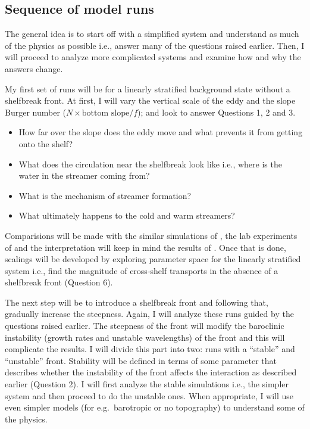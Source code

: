 \subsection{Sequence of model runs} \label{sec:work}

The general idea is to start off with a simplified system and understand as much of the physics as possible i.e., answer many of the questions raised earlier. Then, I will proceed to analyze more complicated systems and examine how and why the answers change. 

My first set of runs will be for a linearly stratified background state without a shelfbreak front. At first, I will vary the vertical scale of the eddy and the slope Burger number ($ N \times \text{bottom slope} / f$); and look to answer Questions 1, 2 and 3.
\begin{itemize}
\item How far over the slope does the eddy move and what prevents it from getting onto the shelf?
\item What does the circulation near the shelfbreak look like i.e., where is the water in the streamer coming from?
\item What is the mechanism of streamer formation?
\item What ultimately happens to the cold and warm streamers?
\end{itemize}

  Comparisions will be made with the similar simulations of \cite{Frolov2004,Oey2004,Hyun2008,Wei2009}, the lab experiments of \cite{Cenedese2012} and the interpretation will keep in mind the results of \cite{Chapman1987,Kelly1988}. Once that is done, scalings will be developed by exploring parameter space for the linearly stratified system i.e., find the magnitude of cross-shelf transports in the absence of a shelfbreak front (Question 6). 
   
The next step will be to introduce a shelfbreak front and following that, gradually increase the steepness. Again, I will analyze these runs guided by  the questions raised earlier. The steepness of the front will modify the baroclinic instability (growth rates and unstable wavelengths) of the front \citep{Lozier2002} and this will complicate the results. I will divide this part into two: runs with a “stable” and “unstable” front. Stability will be defined in terms of some parameter that describes whether the instability of the front affects the interaction as described earlier (Question 2). I will first analyze the stable simulations i.e., the simpler system and then proceed to do the unstable ones. When appropriate, I will use even simpler models (for e.g.\ barotropic or no topography) to understand some of the physics.

